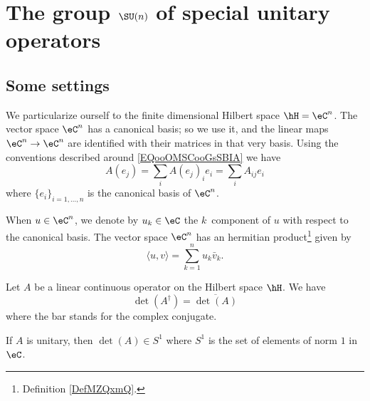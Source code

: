 \section{The group \texorpdfstring{$ \SU(n)$}{SUn} of special unitary operators}

\subsection{Some settings}

We particularize ourself to the finite dimensional Hilbert space \( \hH=\eC^n\). The vector space \( \eC^n\) has a canonical basis; so we use it, and the linear maps \( \eC^n\to \eC^n\) are identified with their matrices in that very basis. Using the conventions described around \eqref{EQooOMSCooGsSBIA} we have 
\begin{equation}
    A(e_j)=\sum_iA(e_j)_ie_i=\sum_iA_{ij}e_i
\end{equation}
where \( \{ e_i \}_{i=1,\ldots, n}\) is the canonical basis of \( \eC^n\).

When \( u\in \eC^n\), we denote by \( u_k\in \eC\) the \( k\)\ieme\ component of \( u\) with respect to the canonical basis. The vector space \( \eC^n\) has an hermitian product\footnote{Definition \ref{DefMZQxmQ}.} given by
\begin{equation}
    \langle u, v\rangle =\sum_{k=1}^nu_k\bar v_k.
\end{equation}

\begin{lemma}       \label{LEMooKEUZooUjQVmp}
    Let \( A\) be a linear continuous operator on the Hilbert space \( \hH\). We have
    \begin{equation}
        \det(A^{\dag})=\overline{ \det(A) }
    \end{equation}
    where the bar stands for the complex conjugate.

    If \( A\) is unitary, then \( \det(A)\in S^1\) where \( S^1\) is the set of elements of norm \( 1\) in \( \eC\).
\end{lemma}

